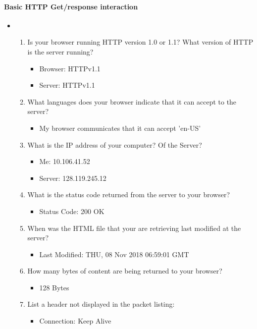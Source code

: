 \documentclass{article}
\begin{document}
\paragraph{Basic HTTP Get/response interaction}
  \begin{itemize}
    \item\begin{enumerate}
      \item Is your browser running HTTP version 1.0 or 1.1? What version of HTTP is the server running?
        \begin{itemize}
          \item Browser: HTTPv1.1
          \item Server: HTTPv1.1
        \end{itemize}
      \item What languages does your browser indicate that it can accept to the server?
      \begin{itemize}
        \item My browser communicates that it can accept 'en-US'
      \end{itemize}
      \item What is the IP address of your computer? Of the Server? 
        \begin{itemize}
          \item Me: 10.106.41.52
          \item Server: 128.119.245.12
        \end{itemize}
      \item What is the status code returned from the server to your browser? 
        \begin{itemize}
          \item Status Code: 200 OK
        \end{itemize}
      \item When was the HTML file that your are retrieving last modified at the server?
        \begin{itemize}
          \item Last Modified: THU, 08 Nov 2018 06:59:01 GMT
        \end{itemize}
      \item How many bytes of content are being returned to your browser?
        \begin{itemize}
          \item 128 Bytes
        \end{itemize}
      \item List a header not displayed in the packet listing:
        \begin{itemize}
          \item Connection: Keep Alive
        \end{itemize} 
    \end{enumerate}
  \end{itemize}
\end{document}
